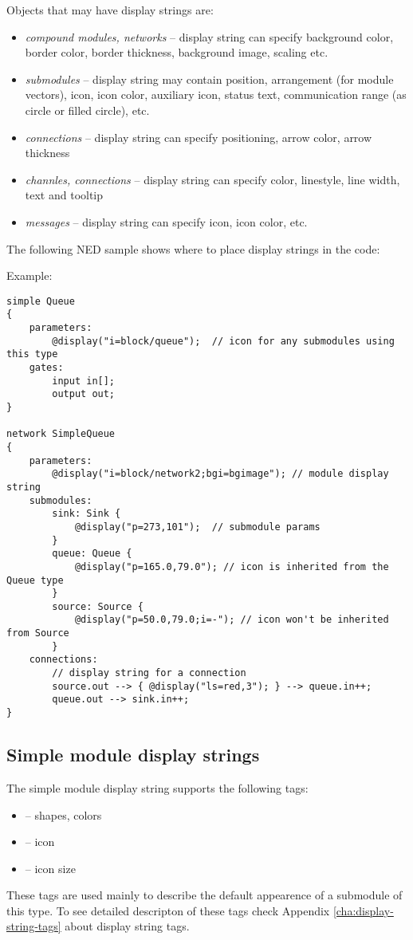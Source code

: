 Objects that may have display strings are:
\begin{itemize}
  \item \textit{compound modules, networks} -- display string can specify background color,
        border color, border thickness, background image, scaling etc.
  \item \textit{submodules} -- display string may contain position, arrangement
        (for module vectors), icon, icon color, auxiliary icon, status text,
        communication range (as circle or filled circle), etc.
  \item \textit{connections} -- display string can specify positioning, arrow color,
        arrow thickness
  \item \textit{channles, connections} -- display string can specify color,
        linestyle, line width, text and tooltip
  \item \textit{messages} -- display string can specify icon, icon color, etc.
\end{itemize}

The following NED sample shows where to place display strings in the code:

Example:
\begin{verbatim}
simple Queue
{
    parameters:
        @display("i=block/queue");  // icon for any submodules using this type
    gates:
        input in[];
        output out;
}

network SimpleQueue
{
    parameters:
        @display("i=block/network2;bgi=bgimage"); // module display string
    submodules:
        sink: Sink {
            @display("p=273,101");  // submodule params
        }
        queue: Queue {
            @display("p=165.0,79.0"); // icon is inherited from the Queue type
        }
        source: Source {
            @display("p=50.0,79.0;i=-"); // icon won't be inherited from Source
        }
    connections:
        // display string for a connection
        source.out --> { @display("ls=red,3"); } --> queue.in++;
        queue.out --> sink.in++;
}

\end{verbatim}


\subsection{Simple module display strings}

The simple module display string supports the following tags:
\begin{itemize}
  \item{ -- shapes, colors}
  \item{ -- icon}
  \item{ -- icon size}
\end{itemize}
These tags are used mainly to describe the default appearence of
a submodule of this type. To see detailed descripton of 
these tags check Appendix \ref{cha:display-string-tags} about 
display string tags.

